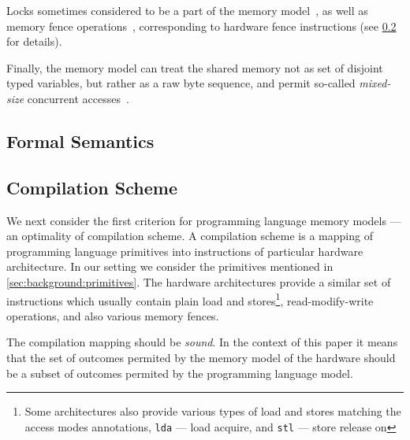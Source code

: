 Locks sometimes considered to be a part 
of the memory model~\cite{Manson-al:POPL05}, 
as well as memory fence operations~\cite{Batty-al:POPL11},
corresponding to hardware fence instructions
(see \cref{sec:background:compile} for details). 

Finally, the memory model can treat the shared memory 
not as set of disjoint typed variables, but rather as 
a raw byte sequence, and permit so-called \emph{mixed-size} 
concurrent accesses~\cite{Flur-al:POPL17}. 



\subsection{Formal Semantics}

\subsection{Compilation Scheme}
\label{sec:background:compile}

We next consider the first criterion for 
programming language memory models --- 
an optimality of compilation scheme. 
A compilation scheme is a mapping of 
programming language primitives into 
instructions of particular hardware architecture. 
In our setting we consider the primitives 
mentioned in \cref{sec:background:primitives}.
The hardware architectures provide a similar set 
of instructions which usually contain 
plain load and stores\footnote{Some architectures 
also provide various types of load and stores
matching the access modes annotations, 
\eg \texttt{lda} --- load acquire, 
and \texttt{stl} --- store release on }, 
read-modify-write operations, 
and also various memory fences.    

The compilation mapping should be \emph{sound}.
In the context of this paper it means that 
the set of outcomes permited by the 
memory model of the hardware should be 
a subset of outcomes permited by the 
programming language model. 

